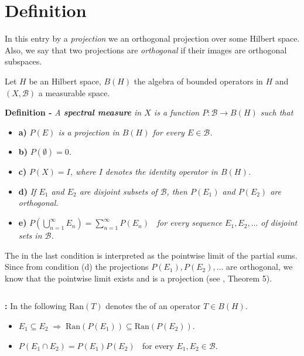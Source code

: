 \documentclass[12pt]{article}
\begin{document}

\section{Definition}

In this entry by a \emph{projection} we  an orthogonal projection over some Hilbert space. Also, we say that two projections are \emph{orthogonal} if their images are orthogonal subspaces.

Let $H$ be an Hilbert space, $B(H)$ the algebra of bounded operators in $H$ and $(X, \mathcal{B})$ a measurable space.

{\bf Definition -} \emph{A {\bf spectral measure} in $X$ is a function $P : \mathcal{B} \longrightarrow B(H)$ such that}
\begin{itemize}
\item[] {\bf a)} \emph{$P(E)$ is a projection in $B(H)$ for every $E \in \mathcal{B}$.}
\item[] {\bf b)} \emph{$P(\emptyset)=0$.}
\item[] {\bf c)} \emph{$P(X) = I$, where $I$ denotes the identity operator in $B(H)$.}
\item[] {\bf d)} \emph{If $E_1$ and $E_2$ are disjoint subsets of $\mathcal{B}$, then $P(E_1)$ and $P(E_2)$ are orthogonal.}
\item[] {\bf e)} \emph{$\displaystyle P(\bigcup_{n=1}^{\infty} E_n) = \sum_{n=1}^{\infty} P(E_n)\;\;$ for every sequence $E_1, E_2, \ldots$ of disjoint sets in $\mathcal{B}$.}
\end{itemize}

The  in the last condition is interpreted as the pointwise limit of the partial sums. Since from condition (d) the projections $P(E_1), P(E_2), \ldots$ are orthogonal, we know that the pointwise limit exists and is a projection (see , Theorem 5).

$\,$

{\bf {} :} In the following $\mathrm{Ran}(T)$ denotes the  of an operator $T \in B(H)$. 
\begin{itemize}
\item $E_1 \subseteq E_2\; \Longrightarrow \; \mathrm{Ran}(P(E_1)) \subseteq \mathrm{Ran}(P(E_2))$.
\item $P(E_1 \cap E_2) = P(E_1)P(E_2)\;\;$ for every $E_1, E_2 \in \mathcal{B}$.
\end{itemize}
\end{document}
